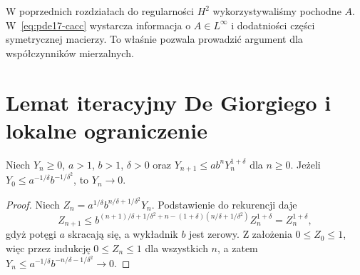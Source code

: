 \begin{uwaga}
W poprzednich rozdziałach do regularności $H^2$ wykorzystywaliśmy
pochodne $A$. W~\eqref{eq:pde17-cacc} wystarcza informacja o
$A\in L^\infty$ i dodatniości części symetrycznej macierzy.
To właśnie pozwala prowadzić argument dla współczynników mierzalnych.
\end{uwaga}

\section{Lemat iteracyjny De Giorgiego i lokalne ograniczenie}
\label{sec:pde17-degiorgi}
\begin{lemat}
\label{lem:pde17-iteration}
Niech $Y_n\ge0$, $a>1$, $b>1$, $\delta>0$ oraz
$Y_{n+1}\le a b^n Y_n^{1+\delta}$ dla $n\ge0$.
Jeżeli $Y_0\le a^{-1/\delta}b^{-1/\delta^2}$,
to $Y_n\to0$.
\end{lemat}
\begin{proof}
Niech $Z_n=a^{1/\delta}b^{n/\delta+1/\delta^2}Y_n$.
Podstawienie do rekurencji daje
\[
 Z_{n+1}\le
 b^{(n+1)/\delta+1/\delta^2+n
 -(1+\delta)(n/\delta+1/\delta^2)}
 Z_n^{1+\delta}=Z_n^{1+\delta},
\]
gdyż potęgi $a$ skracają się, a wykładnik $b$ jest zerowy.
Z założenia $0\le Z_0\le1$, więc przez indukcję
$0\le Z_n\le1$ dla wszystkich $n$, a zatem
$Y_n\le a^{-1/\delta}b^{-n/\delta-1/\delta^2}\to0$.
\end{proof}

